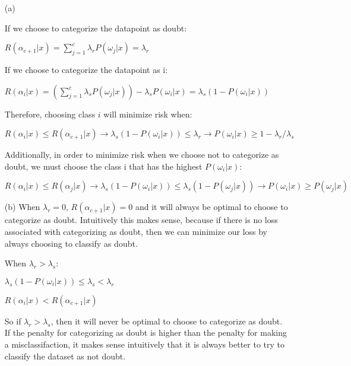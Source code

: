 \documentclass[11pt]{exam}
\theoremstyle{quest}
\begin{document}
\begin{itemize}
\item[(a)] 
  
If we choose to categorize the datapoint as doubt:

$R(\alpha_{c+1} | x) = \sum_{j=1}^c \lambda_r P(\omega_j |x) = \lambda_r$

If we choose to categorize the datapoint as i:

$R(\alpha_i | x) = \left( \sum_{j=1}^c \lambda_s P(\omega_j |x) \right) - \lambda_s P(\omega_i|x) = \lambda_s (1 - P(\omega_i|x))$

Therefore, choosing class $i$ will minimize risk when:

$R(\alpha_i | x) \leq R(\alpha_{c+1} | x) \rightarrow \lambda_s (1 - P(\omega_i|x)) \leq \lambda_r \rightarrow P(\omega_i|x) \geq 1-\lambda_r/\lambda_s$

Additionally, in order to minimize risk when we choose not to categorize as doubt, we must choose the class i that has the highest $P(\omega_i|x)$:

$R(\alpha_i | x) \leq R(\alpha_{j} | x) \rightarrow \lambda_s (1 - P(\omega_i|x)) \leq \lambda_s (1 - P(\omega_j|x)) \rightarrow P(\omega_i|x) \geq P(\omega_j|x)$


\item[(b)] When $\lambda_r=0$, $R(\alpha_{c+1}|x) = 0$ and it will always be optimal to choose to categorize as doubt. Intuitively this makes sense, because if there is no loss associated with categorizing as doubt, then we can minimize our loss by always choosing to classify as doubt.

When $\lambda_r>\lambda_s$:

$\lambda_s (1 - P(\omega_i|x)) \leq \lambda_s < \lambda_r$ 

$R(\alpha_i | x) < R(\alpha_{c+1}|x)$

So if $\lambda_r>\lambda_s$, then it will never be optimal to choose to categorize as doubt.  If the penalty for categorizing as doubt is higher than the penalty for making a misclassifaction, it makes sense intuitively that it is always better to try to classify the dataset as not doubt.





\end{itemize}

\newpage
\end{document}
